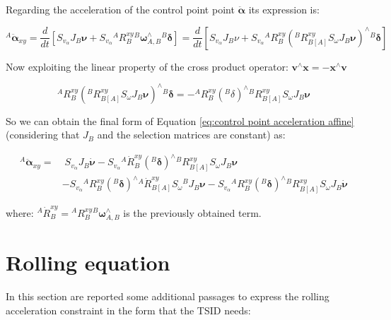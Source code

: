 Regarding the acceleration of the control point point $\ddot{\bm{\alpha}}$ its expression is:

\begin{equation*}
{}^{A}\ddot{\bm{\alpha}}_{xy} = \frac{d}{dt} [S_{v_{\alpha}}J_{B}\bm{\nu} + S_{v_{\alpha}}{}^{A}R^{xy}_{B} {}^{B}\bm{\omega}^{\wedge{}}_{A,B} {}^{B}\bm{\delta}] = \frac{d}{dt} [S_{v_{\alpha}}J_{B}\nu + S_{v_{\alpha}}{}^{A}R^{xy}_{B}({}^{B}R^{xy}_{B[A]}S_{\omega}J_{B} \bm{\nu})^{\wedge}{}^{B}\bm{\delta}]
\end{equation*}


Now exploiting the linear property of the cross product operator: $\mathbf{v}^{\wedge{}}\mathbf{x} = - \mathbf{x}^{\wedge{}}\mathbf{v}$

\begin{equation*}
{}^{A}R^{xy}_{B}({}^{B}R^{xy}_{B[A]}S_{\omega}J_{B} \bm{\nu})^{\wedge{}}{}^{B}\bm{\delta} = - {}^{A}R^{xy}_{B}({}^{B}\delta)^{\wedge{}}{}^{B}R^{xy}_{B[A]}S_{\omega}J_{B} \bm{\nu}
\end{equation*}

So we can obtain the final form of Equation \eqref{eq:control point acceleration affine} (considering that $J_{B}$ and the selection matrices are constant) as:

\begin{equation*}
\begin{aligned}
{}^{A} \ddot{\bm{\alpha}}_{xy} = & \; S_{v_{\alpha}}J_{B}\dot{\bm{\nu}} - S_{v_{\alpha}}{}^{A} \dot{R}^{xy}_{B} ({}^{B}\bm{\delta}) ^\wedge {}^{B}R^{xy}_{B[A]}S_{\omega}J_{B} \bm{\nu} \\
& - S_{v_{\alpha}}{}^{A} R^{xy}_{B}({}^{B}\bm{\delta})^\wedge {}^{A}\dot{R}^{xy}_{B[A]} S_{\omega}{}^{B} J_{B} \bm{\nu} - S_{v_{\alpha}}{}^{A} R^{xy}_{B}({}^{B}\bm{\delta})^\wedge {}^{B}R^{xy}_{B[A]} S_{\omega}J_{B} \dot{\bm{\nu}}
\end{aligned}
\label{eq:control point acceleration affine}
\end{equation*}

where: ${}^{A} \dot{R}^{xy}_{B} = {}^{A}R^{xy}_{B} {}^{B}\bm{\omega}^{\wedge{}}_{A,B}$ is the previously obtained term.
    
\section{Rolling equation}
\label{sec:Rolling equation}

In this section are reported some additional passages to express the rolling acceleration constraint in the form that the TSID needs:

